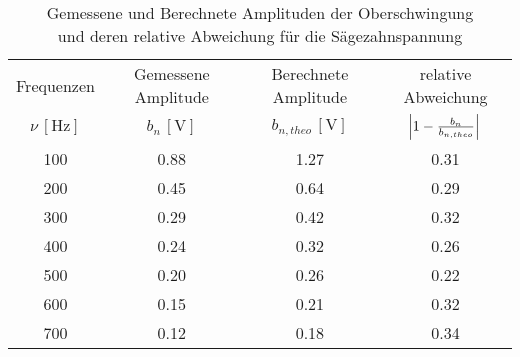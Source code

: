 \begin{table}[!h]
	\centering
	\begin{tabular}{|c|c|c|c|}
		\hline
		Frequenzen & Gemessene Amplitude & Berechnete Amplitude & relative Abweichung \\
		$\nu\,[\si{\hertz}]$ & $b_{n}\,[\si{\volt}]$ & $b_{n,theo}\,[\si{\volt}]$ & $\envert{1 - \tfrac{b_{n}}{b_{n,theo}}}$ \\\hline\hline
		\num{100}  & \num{0.88}  & \num{1.27} & \num{0.31} \\
		\num{200}  & \num{0.45}  & \num{0.64} & \num{0.29} \\
		\num{300}  & \num{0.29}  & \num{0.42} & \num{0.32} \\
		\num{400}  & \num{0.24}  & \num{0.32} & \num{0.26} \\
		\num{500}  &\num{0.20}    & \num{0.26} & \num{0.22} \\
		\num{600}  & \num{0.15}  & \num{0.21} & \num{0.32} \\
		\num{700}  & \num{0.12}  & \num{0.18} & \num{0.34} \\
		\hline
	\end{tabular}
	\caption{Gemessene und Berechnete Amplituden der Oberschwingung\\ \hspace*{2.1cm}und deren relative Abweichung für die Sägezahnspannung \label{tab:Analyse3}}
\end{table}